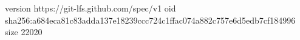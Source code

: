 version https://git-lfs.github.com/spec/v1
oid sha256:a684eca81c83adda137e18239ccc724c1ffac074a882c757e6d5edb7cf184996
size 22020
